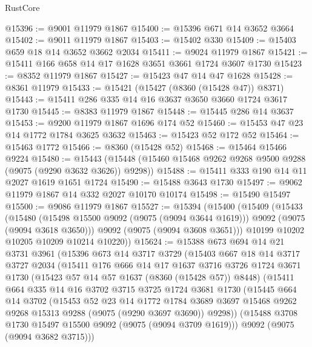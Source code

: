 \begin{lexlean}{RustCore}
\begin{coremodule}
@15396 := @9001 @11979 @1867
@15400 := @15396 @671 @14 @3652 @3664
@15402 := @9011 @11979 @1867
@15403 := @15402 @330
@15409 := @15403 @659 @18 @14 @3652 @3662 @2034
@15411 := @9024 @11979 @1867
@15421 := @15411 @166 @658 @14 @17 @1628 @3651 @3661 @1724 @3607 @1730
@15423 := @8352 @11979 @1867
@15427 := @15423 @47 @14 @47 @1628
@15428 := @8361 @11979
@15433 := @15421 (@15427 (@8360 (@15428 @47)) @8371)
@15443 := @15411 @286 @335 @14 @16 @3637 @3650 @3660 @1724 @3617 @1730
@15445 := @8383 @11979 @1867
@15448 := @15445 @286 @14 @3637
@15453 := @9200 @11979 @1867 @1696 @174 @52
@15460 := @15453 @47 @23 @14 @1772 @1784 @3625 @3632
@15463 := @15423 @52 @172 @52
@15464 := @15463 @1772
@15466 := @8360 (@15428 @52)
@15468 := @15464 @15466 @9224
@15480 := @15443 (@15448 (@15460 @15468 @9262 @9268 @9500 @9288 (@9075 (@9290 @3632 @3626)) @9298))
@15488 := @15411 @333 @190 @14 @11 @2027 @1619 @1651 @1724
@15490 := @15488 @3643 @1730
@15497 := @9062 @11979 @1867 @14 @332 @2027 @10170 @10174
@15498 := @15490 @15497
@15500 := @9086 @11979 @1867
@15527 := @15394
    (@15400
      (@15409
        (@15433
          (@15480
            (@15498 @15500 @9092 (@9075 (@9094 @3644 @1619)))
            @9092
            (@9075 (@9094 @3618 @3650)))
          @9092
          (@9075 (@9094 @3608 @3651)))
        @10199
        @10202
        @10205
        @10209
        @10214
        @10220))
@15624 := @15388
    @673
    @694
    @14
    @21
    @3731
    @3961
    (@15396
      @673
      @14
      @3717
      @3729
      (@15403
        @667
        @18
        @14
        @3717
        @3727
        @2034
        (@15411
          @176
          @666
          @14
          @17
          @1637
          @3716
          @3726
          @1724
          @3671
          @1730
          (@15423 @57 @14 @57 @1637 (@8360 (@15428 @57)) @8448)
          (@15411
            @664
            @335
            @14
            @16
            @3702
            @3715
            @3725
            @1724
            @3681
            @1730
            (@15445
              @664
              @14
              @3702
              (@15453
                @52
                @23
                @14
                @1772
                @1784
                @3689
                @3697
                @15468
                @9262
                @9268
                @15313
                @9288
                (@9075 (@9290 @3697 @3690))
                @9298))
            (@15488 @3708 @1730 @15497 @15500 @9092 (@9075 (@9094 @3709 @1619)))
            @9092
            (@9075 (@9094 @3682 @3715)))

\end{coremodule}
\end{lexlean}
